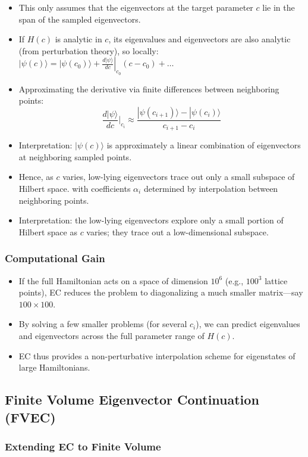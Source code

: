 \begin{itemize}
	\item This only assumes that the eigenvectors at the target parameter $c$ lie in the span of the sampled eigenvectors.
	\item If $H(c)$ is analytic in $c$, its eigenvalues and eigenvectors are also analytic (from perturbation theory), so locally: $|\psi(c)\rangle = |\psi(c_0)\rangle + \left.\frac{d|\psi\rangle}{dc}\right|_{c_0} (c - c_0) + \dots$
	\item Approximating the derivative via finite differences between neighboring points:
	\[
	\frac{d|\psi\rangle}{dc}\Big|_{c_i} \approx \frac{|\psi(c_{i+1})\rangle - |\psi(c_i)\rangle}{c_{i+1}-c_i}
	\]
	\item Interpretation: $|\psi(c)\rangle$ is approximately a linear combination of eigenvectors at neighboring sampled points.
	\item Hence, as $c$ varies, low-lying eigenvectors trace out only a small subspace of Hilbert space.
	with coefficients $\alpha_i$ determined by interpolation between neighboring points.
	\item Interpretation: the low-lying eigenvectors explore only a small portion of Hilbert space as $c$ varies; they trace out a low-dimensional subspace.
\end{itemize}

\subsubsection{Computational Gain}
\begin{itemize}
	\item If the full Hamiltonian acts on a space of dimension $10^6$ (e.g., $100^3$ lattice points),
	EC reduces the problem to diagonalizing a much smaller matrix—say $100 \times 100$.
	\item By solving a few smaller problems (for several $c_i$), we can predict eigenvalues and eigenvectors across the full parameter range of $H(c)$.
	\item EC thus provides a non-perturbative interpolation scheme for eigenstates of large Hamiltonians.
\end{itemize}


\subsection{Finite Volume Eigenvector Continuation (FVEC)}

\subsubsection{Extending EC to Finite Volume}

